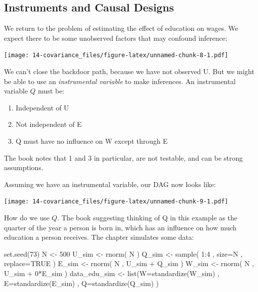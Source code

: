 \documentclass[
]{book}
\newenvironment{Shaded}{\begin{snugshade}}{\end{snugshade}}
\newcommand{\AttributeTok}[1]{\textcolor[rgb]{0.77,0.63,0.00}{#1}}
\newcommand{\ConstantTok}[1]{\textcolor[rgb]{0.00,0.00,0.00}{#1}}
\newcommand{\DecValTok}[1]{\textcolor[rgb]{0.00,0.00,0.81}{#1}}
\newcommand{\FunctionTok}[1]{\textcolor[rgb]{0.00,0.00,0.00}{#1}}
\newcommand{\NormalTok}[1]{#1}
\newcommand{\OtherTok}[1]{\textcolor[rgb]{0.56,0.35,0.01}{#1}}
\newcommand{\SpecialCharTok}[1]{\textcolor[rgb]{0.00,0.00,0.00}{#1}}
\providecommand{\tightlist}{%
  \setlength{\itemsep}{0pt}\setlength{\parskip}{0pt}}
\begin{document}
\hypertarget{instruments-and-causal-designs}{%
\subsection*{Instruments and Causal Designs}\label{instruments-and-causal-designs}}

We return to the problem of estimating the effect of education on wages. We expect there to be some unobserved factors that may confound inference:

\texttt{[image: 14-covariance\_files/figure-latex/unnamed-chunk-8-1.pdf]}

We can't close the backdoor path, because we have not observed U. But we might be able to use an \emph{instrumental variable} to make inferences. An instrumental variable \(Q\) must be:

\begin{enumerate}
\def\labelenumi{(\arabic{enumi})}
\tightlist
\item
  Independent of U
\item
  Not independent of E
\item
  Q must have no influence on W except through E
\end{enumerate}

The book notes that 1 and 3 in particular, are not testable, and can be strong assumptions.

Assuming we have an instrumental variable, our DAG now looks like:

\texttt{[image: 14-covariance\_files/figure-latex/unnamed-chunk-9-1.pdf]}

How do we use \(Q\). The book suggesting thinking of Q in this example as the quarter of the year a person is born in, which has an influence on how much education a person receives. The chapter simulates some data:

\begin{Shaded}
\begin{Highlighting}[]
\FunctionTok{set.seed}\NormalTok{(}\DecValTok{73}\NormalTok{) }
\NormalTok{N }\OtherTok{\textless{}{-}} \DecValTok{500} 
\NormalTok{U\_sim }\OtherTok{\textless{}{-}} \FunctionTok{rnorm}\NormalTok{( N ) }
\NormalTok{Q\_sim }\OtherTok{\textless{}{-}} \FunctionTok{sample}\NormalTok{( }\DecValTok{1}\SpecialCharTok{:}\DecValTok{4}\NormalTok{ , }\AttributeTok{size=}\NormalTok{N , }\AttributeTok{replace=}\ConstantTok{TRUE}\NormalTok{ ) }
\NormalTok{E\_sim }\OtherTok{\textless{}{-}} \FunctionTok{rnorm}\NormalTok{( N , U\_sim }\SpecialCharTok{+}\NormalTok{ Q\_sim ) }
\NormalTok{W\_sim }\OtherTok{\textless{}{-}} \FunctionTok{rnorm}\NormalTok{( N , U\_sim }\SpecialCharTok{+} \DecValTok{0}\SpecialCharTok{*}\NormalTok{E\_sim ) }
\NormalTok{data\_edu\_sim }\OtherTok{\textless{}{-}} \FunctionTok{list}\NormalTok{(}\AttributeTok{W=}\FunctionTok{standardize}\NormalTok{(W\_sim) , }
                \AttributeTok{E=}\FunctionTok{standardize}\NormalTok{(E\_sim) ,}
                \AttributeTok{Q=}\FunctionTok{standardize}\NormalTok{(Q\_sim) )}
\end{Highlighting}
\end{Shaded}
\end{document}
